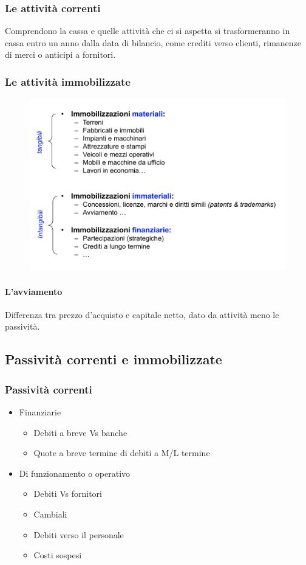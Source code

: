 \documentclass{report}
\begin{document}
	\subsubsection{Le attività correnti}
	Comprendono la cassa e quelle attività che ci si aspetta si trasformeranno in cassa entro un anno dalla data di bilancio, come crediti verso clienti, rimanenze di merci o anticipi a fornitori.
	\newpage
	\subsubsection{Le attività immobilizzate}
	\begin{figure}[h]
		\centering
		\includegraphics[width=0.7\linewidth]{images/attivita-immobilizzate}
		\label{fig:attivita-immobilizzate}
	\end{figure}
	\paragraph{L'avviamento} Differenza tra prezzo d'acquisto e capitale netto, dato da attività meno le passività.
	\subsection{Passività correnti e immobilizzate}
	\subsubsection{Passività correnti}
	\begin{itemize}
		\item Finanziarie
		\begin{itemize}
			\item Debiti a breve Vs banche
			\item Quote a breve termine di debiti a M/L termine\\
		\end{itemize}
		\item Di funzionamento o operativo
		\begin{itemize}
			\item Debiti Vs fornitori
			\item Cambiali
			\item Debiti verso il personale
			\item Costi sospesi
		\end{itemize}
	\end{itemize}
\end{document}
